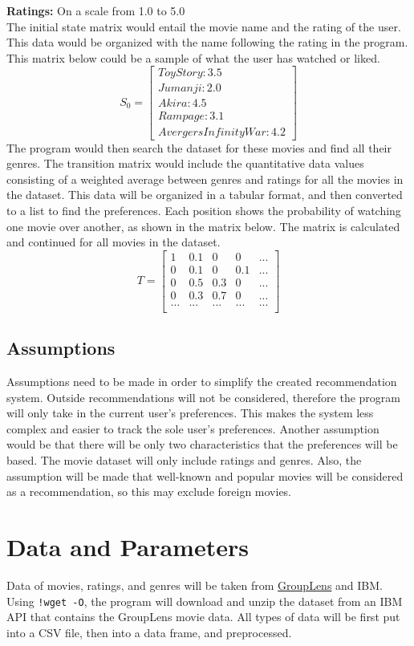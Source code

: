\documentclass{article}
\begin{document}
\textbf{Ratings:} On a scale from 1.0 to 5.0\\

The initial state matrix would entail the movie name and the rating of the user. This data would be organized with the name following 
the rating in the program. This matrix below could be a sample
of what the user has watched or liked.
$$
S_0 =
\begin{bmatrix}
Toy Story:3.5 \\
Jumanji:2.0 \\
Akira:4.5 \\
Rampage:3.1 \\
Avergers Infinity War: 4.2
\end{bmatrix}
$$
    The program would then search the dataset for these movies and find all their genres. The transition matrix would include the 
quantitative data values consisting of a weighted average between genres and ratings for all the movies in the dataset. This data will be 
organized in a tabular format, and then converted to a list to find the preferences. Each position shows the probability of watching one 
movie over another, as shown in the matrix below. The matrix is calculated and continued for all movies in the dataset.
$$
T =
\begin{bmatrix}
1 & 0.1 & 0 & 0 & ...\\
0 & 0.1 & 0 & 0.1 & ...\\
0 & 0.5 & 0.3 & 0 & ...\\
0 & 0.3 & 0.7 & 0 & ...\\
... & ... & ... & ... & ...\\
\end{bmatrix}
$$ 

\subsection{Assumptions}
Assumptions need to be made in order to simplify the created recommendation system. Outside recommendations will not be considered, therefore the program will only take in 
the current user's preferences. This makes the system less complex and easier to track the sole user's preferences. 
Another assumption would be that there will be only two characteristics that the preferences will be based. The movie dataset will only include ratings and 
genres. Also, the assumption will be made that well-known and popular movies will be considered as a recommendation, so this may exclude foreign movies.


\section{Data and Parameters}
Data of movies, ratings, and genres will be taken from \href{http://grouplens.org/datasets/movielens/}{GroupLens} and IBM.  Using \verb|!wget -O|, the program will 
download and unzip the dataset from an IBM API that contains the GroupLens movie data. All types of data will be 
first put into a CSV file, then into a data frame, and preprocessed.\\
\end{document}
